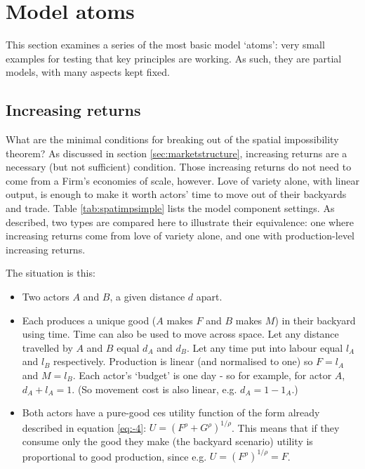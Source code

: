 \section{Model atoms \label{sec:modelatoms}}

This section examines a series of the most basic model `atoms': very small examples for testing that key principles are working. As such, they are partial models, with many aspects kept fixed. 

\subsection{Increasing returns \label{sec:modelatom_increts}}

What are the minimal conditions for breaking out of the spatial impossibility theorem? As discussed in section \ref{sec:marketstructure}, increasing returns are a necessary (but not sufficient) condition. Those increasing returns do not need to come from a Firm's economies of scale, however. Love of variety alone, with linear output, is enough to make it worth actors' time to move out of their backyards and trade. Table \ref{tab:spatimpsimple} lists the model component settings. As described, two types are compared here to illustrate their equivalence: one where increasing returns come from love of variety alone, and one with production-level increasing returns.



The situation is this:

\begin{itemize}
	\item Two actors $A$ and $B$, a given distance $d$ apart.
	\item Each produces a unique good ($A$ makes $F$ and $B$ makes $M$) in their backyard using time. Time can also be used to move across space. Let any distance travelled by $A$ and $B$ equal $d_A$ and $d_B$. Let any time put into labour equal $l_A$ and $l_B$ respectively. Production is linear (and normalised to one) so $F = l_A$ and $M = l_B$. Each actor's `budget' is one day - so for example, for actor $A$, $d_A + l_A = 1$. (So movement cost is also linear, e.g. $d_A = 1 - 1_A$.)
	\item Both actors have a pure-good \gls{ces} utility function of the form already described in equation \eqref{eq:-4}: $U = (F^\rho + G^\rho)^{1/\rho}$. This means that if they consume only the good they make (the backyard scenario) utility is proportional to good production, since e.g. $U=(F^\rho)^{1/\rho} = F$.
\end{itemize}


